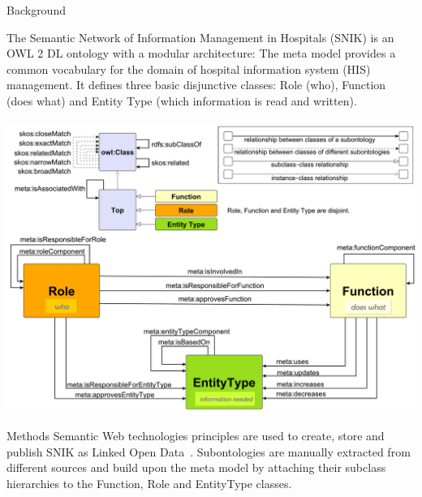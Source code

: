 \documentclass[portrait,final,a0paper,fontscale=0.320]{imiseposter}
\begin{document}
\begin{poster}
\begin{posterbox}[name=background,column=0,row=0]{Background}

The Semantic Network of Information Management in Hospitals (SNIK) is an OWL 2 DL ontology with a modular architecture:
The meta model provides a common vocabulary for the domain of hospital information system (HIS) management.
It defines three basic disjunctive classes: Role (who), Function (does what) and Entity Type (which information is read and written).\\
~\\
\includegraphics[width=1.01\columnwidth]{img/metamodel9s.pdf}
\vspace{-2em}
\end{posterbox}
\begin{posterbox}[name=methods,below=background]{Methods}
Semantic Web technologies principles are used to create, store and publish SNIK as Linked Open Data~\cite{sniktec}.
Subontologies are manually extracted from different sources and build upon the meta model by attaching their subclass hierarchies to the Function, Role and EntityType classes.\\
~\\

\end{posterbox}
\end{poster}
\end{document}
